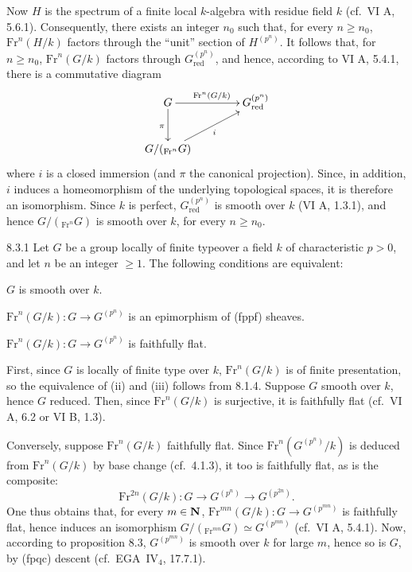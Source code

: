 Now $H$ is the spectrum of a finite local $k$-algebra with residue field $k$ (cf.\ VI A, 5.6.1). Consequently, there exists an integer $n_0$ such that, for every $n\geq n_0$, $\mathrm{Fr}^n(H/k)$ factors through the ``unit'' section of $H^{(p^n)}$. It follows that, for $n\geq n_0$, $\mathrm{Fr}^n(G/k)$ factors through $G_{\mathrm{red}}^{(p^n)}$, and hence, according to VI A, 5.4.1, there is a commutative diagram
\[
\xymatrix@C=4em{G\ar[r]^{\mathrm{Fr}^n(G/k)}\ar[d]_\pi&G_{\mathrm{red}}^{(p^n)}\\G/({}_{\mathrm{Fr}^n}G)\ar[ur]_i&}
\]
where $i$ is a closed immersion (and $\pi$ the canonical projection). Since, in addition, $i$ induces a homeomorphism of the underlying topological spaces, it is therefore an isomorphism. Since $k$ is perfect, $G_{\mathrm{red}}^{(p^n)}$ is smooth over $k$ (VI A, 1.3.1), and hence $G/({}_{\mathrm{Fr}^n}G)$ is smooth over $k$, for every $n\geq n_0$.

\begin{corollary}{8.3.1}\label{VIIA.8.3.1}
Let $G$ be a group locally of finite type\footnotemark[80] over a field $k$ of characteristic $p>0$, and let $n$ be an integer $\geq1$. The following conditions are equivalent:
\begin{enumeratei}
\item $G$ is smooth over $k$.
\item $\mathrm{Fr}^n(G/k):G\to G^{(p^n)}$ is an epimorphism of (fppf) sheaves.
\item $\mathrm{Fr}^n(G/k):G\to G^{(p^n)}$ is faithfully flat.
\end{enumeratei}
\end{corollary}
First, since $G$ is locally of finite type over $k$, $\mathrm{Fr}^n(G/k)$ is of finite presentation, so the equivalence of (ii) and (iii) follows from 8.1.4. Suppose $G$ smooth over $k$, hence $G$ reduced. Then, since $\mathrm{Fr}^n(G/k)$ is surjective, it is faithfully flat (cf.\ VI A, 6.2 or VI B, 1.3).

Conversely, suppose $\mathrm{Fr}^n(G/k)$ faithfully flat. Since $\mathrm{Fr}^n(G^{(p^n)}/k)$ is deduced from $\mathrm{Fr}^n(G/k)$ by base change (cf.\ 4.1.3), it too is faithfully flat, as is the composite:
\[
\mathrm{Fr}^{2n}(G/k):G\longrightarrow G^{(p^n)}\longrightarrow G^{(p^{2n})}.
\]
One thus obtains that, for every $m\in\mathbf{N}$, $\mathrm{Fr}^{mn}(G/k):G\to G^{(p^{mn})}$ is faithfully flat, hence induces an isomorphism $G/({}_{\mathrm{Fr}^{mn}}G)\simeq G^{(p^{mn})}$ (cf.\ VI A, 5.4.1). Now, according to proposition 8.3, $G^{(p^{mn})}$ is smooth over $k$ for large $m$, hence so is $G$, by (fpqc) descent (cf.\ EGA~IV$_4$, 17.7.1).

